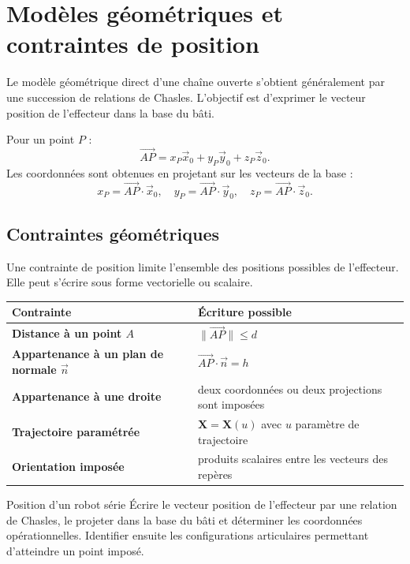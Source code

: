 
\section{Modèles géométriques et contraintes de position}
\label{sec:les-modeles}

Le modèle géométrique direct d'une chaîne ouverte s'obtient généralement
par une succession de relations de Chasles. L'objectif est d'exprimer le
vecteur position de l'effecteur dans la base du bâti.

Pour un point $P$ :
\[
\overrightarrow{AP}=x_P\vec x_0+y_P\vec y_0+z_P\vec z_0.
\]
Les coordonnées sont obtenues en projetant sur les vecteurs de la base :
\[
x_P=\overrightarrow{AP}\cdot\vec x_0,
\quad y_P=\overrightarrow{AP}\cdot\vec y_0,
\quad z_P=\overrightarrow{AP}\cdot\vec z_0.
\]

\subsection{Contraintes géométriques}

Une contrainte de position limite l'ensemble des positions possibles de
l'effecteur. Elle peut s'écrire sous forme vectorielle ou scalaire.

\begin{center}
\small
\begin{tabularx}{\linewidth}{>{\bfseries}p{3.3cm}X}
\toprule
Contrainte & Écriture possible \\
\midrule
Distance à un point $A$ & $\|\overrightarrow{AP}\|\leq d$ \\
Appartenance à un plan de normale $\vec n$ & $\overrightarrow{AP}\cdot\vec n=h$ \\
Appartenance à une droite & deux coordonnées ou deux projections sont imposées \\
Trajectoire paramétrée & $\mathbf X=\mathbf X(u)$ avec $u$ paramètre de trajectoire \\
Orientation imposée & produits scalaires entre les vecteurs des repères \\
\bottomrule
\end{tabularx}
\end{center}

\begin{TLThreeApp}{Position d'un robot série}
Écrire le vecteur position de l'effecteur par une relation de Chasles,
le projeter dans la base du bâti et déterminer les coordonnées
opérationnelles. Identifier ensuite les configurations articulaires
permettant d'atteindre un point imposé.
\end{TLThreeApp}

